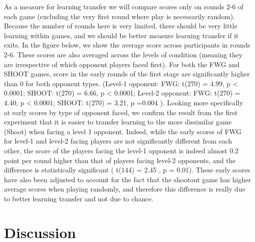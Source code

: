 \documentclass[,man,floatsintext]{apa6}
\begin{document}
As a measure for learning transfer we will compare scores only on rounds 2-6 of each game (excluding the very first round where play is necessarily random). Because the number of rounds here is very limited, there should be very little learning within games, and we should be better measure learning transfer if it exits. In the figure below, we show the average score across participants in rounds 2-6. These scores are also averaged across the levels of condition (meaning they are irrespective of which opponent players faced first). For both the FWG and SHOOT games, score in the early rounds of the first stage are significantly higher than 0 for both opponent types. (Level-1 opponent: FWG: t(270) = 4.99, p \textless{} 0.0001; SHOOT: t(270) = 6.66, p \textless{} 0.0001; Level-2 opponent: FWG: t(270) = 4.40, p \textless{} 0.0001; SHOOT: t(270) = 3.21, p =0.004 ). Looking more specifically at early scores by type of opponent faced, we confirm the result from the first experiment that it is easier to transfer learning to the more dissimilar game (Shoot) when facing a level 1 opponent. Indeed, while the early scores of FWG for level-1 and level-2 facing players are not significantly different from each other, the score of the players facing the level-1 opponent is indeed almost 0.2 point per round higher than that of players facing level-2 opponents, and the difference is statistically significant ( t(144) = 2.45 , p = 0.01). These early scores have also been adjusted to account for the fact that the shootout game has higher average scores when playing randomly, and therefore this difference is really due to better learning transfer and not due to chance.

\hypertarget{discussion}{%
\section{Discussion}\label{discussion}}
\end{document}
